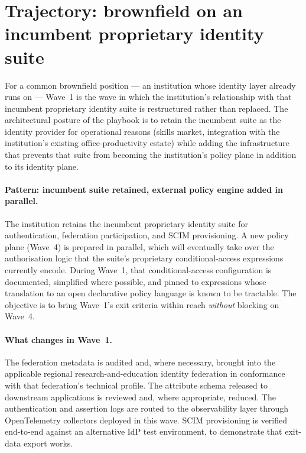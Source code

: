 \section{Trajectory: brownfield on an incumbent proprietary
identity suite}
\label{sec:w1-brownfield-ms}

For a common brownfield position --- an institution whose
identity layer already runs on 
--- Wave~1 is the wave
in which the institution's relationship with that incumbent
proprietary identity suite
is restructured rather than replaced. The architectural posture of
the playbook is to retain the incumbent suite as the identity
provider for
operational reasons (skills market, integration with the
institution's existing office-productivity estate) while adding the
infrastructure that prevents that suite from becoming the
institution's
policy plane in addition to its identity plane.

\paragraph{Pattern: incumbent suite retained, external policy
engine added in parallel.} The
institution retains the incumbent proprietary identity suite for
authentication, federation
participation, and SCIM provisioning. A new policy plane (Wave~4)
is prepared in parallel, which will eventually take over the
authorisation logic that the suite's proprietary conditional-access
expressions currently
encode. During Wave~1, that conditional-access configuration is
documented, simplified where possible, and pinned to expressions
whose translation to an open declarative policy language is known
to be
tractable. The objective is to bring Wave~1's exit criteria within
reach \emph{without} blocking on Wave~4.

\paragraph{What changes in Wave~1.} The federation metadata is
audited and, where necessary, brought into the applicable regional
research-and-education identity federation
in conformance with that federation's technical profile. The
attribute schema released to downstream applications is reviewed
and, where appropriate, reduced. The authentication and assertion
logs are routed to the observability layer through OpenTelemetry
collectors deployed in this wave. SCIM provisioning is verified
end-to-end against an alternative IdP test environment, to
demonstrate that exit-data export works.

